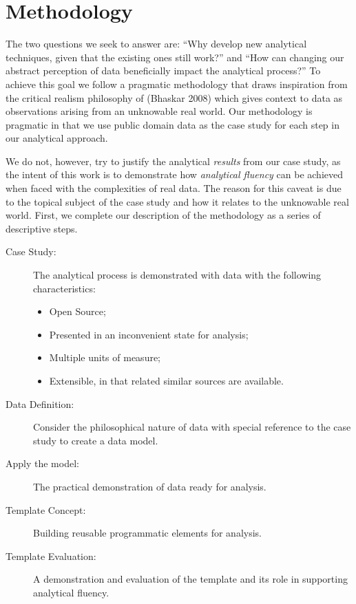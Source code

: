 \documentclass[
]{article}
\begin{document}
\hypertarget{sec:methodology}{%
\section{Methodology}\label{sec:methodology}}

The two questions we seek to answer are: ``Why develop new analytical
techniques, given that the existing ones still work?'' and ``How can
changing our abstract perception of data beneficially impact the
analytical process?'' To achieve this goal we follow a pragmatic
methodology that draws inspiration from the critical realism philosophy
of (Bhaskar 2008) which gives context to data as observations arising
from an unknowable real world. Our methodology is pragmatic in that we
use public domain data as the case study for each step in our analytical
approach.

We do not, however, try to justify the analytical \emph{results} from
our case study, as the intent of this work is to demonstrate how
\emph{analytical fluency} can be achieved when faced with the
complexities of real data. The reason for this caveat is due to the
topical subject of the case study and how it relates to the unknowable
real world. First, we complete our description of the methodology as a
series of descriptive steps.

\begin{description}
\item[Case Study:]
The analytical process is demonstrated with data with the following
characteristics:

\begin{itemize}
\item
  Open Source;
\item
  Presented in an inconvenient state for analysis;
\item
  Multiple units of measure;
\item
  Extensible, in that related similar sources are available.
\end{itemize}
\item[Data Definition:]
Consider the philosophical nature of data with special reference to the
case study to create a data model.
\item[Apply the model:]
The practical demonstration of data ready for analysis.
\item[Template Concept:]
Building reusable programmatic elements for analysis.
\item[Template Evaluation:]
A demonstration and evaluation of the template and its role in
supporting analytical fluency.
\end{description}
\end{document}
